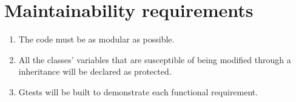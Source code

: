 \documentclass{article}
\makeatletter
\def\threedigits#1{\expandafter\@threedigits\csname c@#1\endcsname}
\def\@threedigits#1{%
  \ifnum#1<100 0\fi
  \ifnum#1<10 0\fi
  \number#1}
\makeatother
\begin{document}
\section{Maintainability requirements}
\begin{enumerate}[label=\textbf{MR\threedigits*}]
	\item The code must be as modular as possible. 
	\item All the classes' variables that are susceptible of being modified through a inheritance will be declared as protected. 
	\item Gtests will be built to demonstrate each functional requirement. 
	
\end{enumerate}


\end{document}
